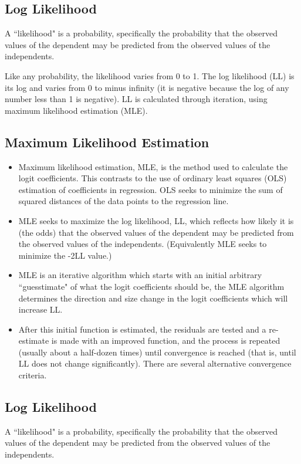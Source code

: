 ﻿\documentclass[a4paper,12pt]{article}
\begin{document}

\subsection{Log Likelihood}
A ``likelihood" is a probability, specifically the probability that the observed values of the dependent may be predicted from the observed values of the independents. 

Like any probability, the likelihood varies from 0 to 1. The log likelihood (LL) is its log and varies from 0 to minus infinity (it is negative because the log of any number less than 1 is negative). LL is calculated through iteration, using maximum likelihood estimation (MLE).


\subsection{Maximum Likelihood Estimation}
\begin{itemize}
\item Maximum likelihood estimation, MLE, is the method used to calculate the logit coefficients. This contrasts to the use of ordinary least squares (OLS) estimation of coefficients in regression. OLS seeks to minimize the sum of squared distances of the data points to the regression line. 
\item MLE seeks to maximize the log likelihood, LL, which reflects how likely it is (the odds) that the observed values of the dependent may be predicted from the observed values of the independents. (Equivalently MLE seeks to minimize the -2LL value.)

\item MLE is an iterative algorithm which starts with an initial arbitrary ``guesstimate" of what the logit coefficients should be, the MLE algorithm determines the direction and size change in the logit coefficients which will increase LL. 
\item After this initial function is estimated, the residuals are tested and a re-estimate is made with an improved function, and the process is repeated (usually about a half-dozen times) until convergence is reached (that is, until LL does not change significantly). There are several alternative convergence criteria.
\end{itemize}




\subsection{Log Likelihood}
A ``likelihood" is a probability, specifically the probability that the observed values of the dependent may be predicted from the observed values of the independents. 
\end{document}
